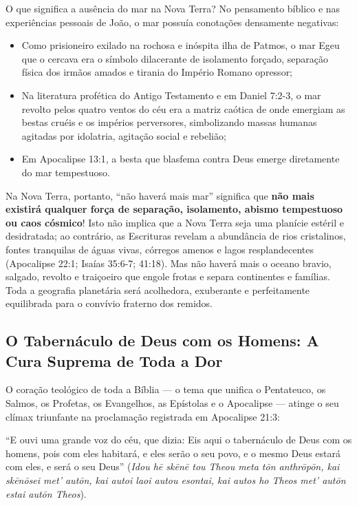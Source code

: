 O que significa a ausência do mar na Nova Terra?
No pensamento bíblico e nas experiências pessoais de João, o mar possuía conotações densamente negativas:
\begin{itemize}
  \item Como prisioneiro exilado na rochosa e inóspita ilha de Patmos, o mar Egeu que o cercava era o símbolo dilacerante de isolamento forçado, separação física dos irmãos amados e tirania do Império Romano opressor;
  \item Na literatura profética do Antigo Testamento e em Daniel 7:2-3, o mar revolto pelos quatro ventos do céu era a matriz caótica de onde emergiam as bestas cruéis e os impérios perversores, simbolizando massas humanas agitadas por idolatria, agitação social e rebelião;
  \item Em Apocalipse 13:1, a besta que blasfema contra Deus emerge diretamente do mar tempestuoso.
\end{itemize}


Na Nova Terra, portanto, ``não haverá mais mar'' significa que \textbf{não mais existirá qualquer força de separação, isolamento, abismo tempestuoso ou caos cósmico}!
Isto não implica que a Nova Terra seja uma planície estéril e desidratada; ao contrário, as Escrituras revelam a abundância de rios cristalinos, fontes tranquilas de águas vivas, córregos amenos e lagos resplandecentes (Apocalipse 22:1; Isaías 35:6-7; 41:18). Mas não haverá mais o oceano bravio, salgado, revolto e traiçoeiro que engole frotas e separa continentes e famílias. Toda a geografia planetária será acolhedora, exuberante e perfeitamente equilibrada para o convívio fraterno dos remidos.



\subsection{O Tabernáculo de Deus com os Homens: A Cura Suprema de Toda a Dor}


O coração teológico de toda a Bíblia — o tema que unifica o Pentateuco, os Salmos, os Profetas, os Evangelhos, as Epístolas e o Apocalipse — atinge o seu clímax triunfante na proclamação registrada em Apocalipse 21:3:

``E ouvi uma grande voz do céu, que dizia: Eis aqui o tabernáculo de Deus com os homens, pois com eles habitará, e eles serão o seu povo, e o mesmo Deus estará com eles, e será o seu Deus'' (\textit{Idou hē skēnē tou Theou meta tōn anthrōpōn, kai skēnōsei met' autōn, kai autoi laoi autou esontai, kai autos ho Theos met' autōn estai autōn Theos}).

